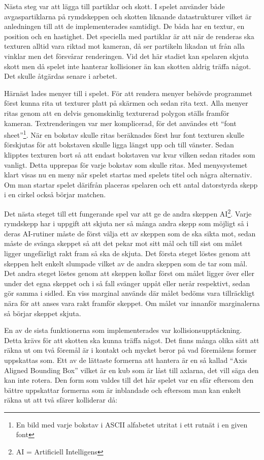 \documentclass[12pt, a4paper]{article}
\begin{document}
	Nästa steg var att lägga till partiklar och skott. I spelet använder både avgaspartiklarna på rymdskeppen och skotten liknande datastrukturer vilket är anledningen till att de implementerades samtidigt. De båda har en textur, en position och en hastighet. Det speciella med partiklar är att när de renderas ska texturen alltid vara riktad mot kameran, då ser partikeln likadan ut från alla vinklar men det försvårar renderingen. Vid det här stadiet kan spelaren skjuta skott men då spelet inte hanterar kollisioner än kan skotten aldrig träffa något. Det skulle åtgärdas senare i arbetet. 
	
	Härnäst lades menyer till i spelet. För att rendera menyer behövde programmet först kunna rita ut texturer platt på skärmen och sedan rita text. Alla menyer ritas genom att en delvis genomskinlig texturerad polygon ställs framför kameran. Textrenderingen var mer komplicerad, för det användes ett ``font sheet''\footnote{En bild med varje bokstav i ASCII alfabetet utritat i ett rutnät i en given font}. När en bokstav skulle ritas beräknades först hur font texturen skulle förskjutas för att bokstaven skulle ligga längst upp och till vänster. Sedan klipptes texturen bort så att endast bokstaven var kvar vilken sedan ritades som vanligt. Detta upprepas för varje bokstav som skulle ritas. Med menysystemet klart visas nu en meny när spelet startas med spelets titel och några alternativ. Om man startar spelet därifrån placeras spelaren och ett antal datorstyrda skepp i en cirkel också börjar matchen. 
	
	Det nästa steget till ett fungerande spel var att ge de andra skeppen AI\footnote{AI = Artificiell Intelligens}. Varje rymdskepp har i uppgift att skjuta ner så många andra skepp som möjligt så i deras AI-rutiner måste de först välja ett av skeppen som de ska sikta mot, sedan måste de svänga skeppet så att det pekar mot sitt mål och till sist om målet ligger ungefärligt rakt fram så ska de skjuta. Det första steget löstes genom att skeppen helt enkelt slumpade vilket av de andra skeppen som de tar som mål. Det andra steget löstes genom att skeppen kollar först om målet ligger över eller under det egna skeppet och i så fall svänger uppåt eller nerår respektivt, sedan gör samma i sidled. En viss marginal används där målet bedöms vara tillräckligt nära för att anses vara rakt framför skeppet. Om målet var innanför marginalerna så börjar skeppet skjuta. 
	
	En av de sista funktionerna som implementerades var kollisionsupptäckning. Detta krävs för att skotten ska kunna träffa något. Det finns många olika sätt att räkna ut om två föremål är i kontakt och mycket beror på vad föremålens former uppskattas som. Ett av de lättaste formerna att hantera är en så kallad ``Axis Aligned Bounding Box'' vilket är en kub som är låst till axlarna, det vill säga den kan inte rotera. Den form som valdes till det här spelet var en sfär eftersom den bättre uppskattar formerna som är inblandade och eftersom man kan enkelt räkna ut att två sfärer kolliderar då:
	
\end{document}
